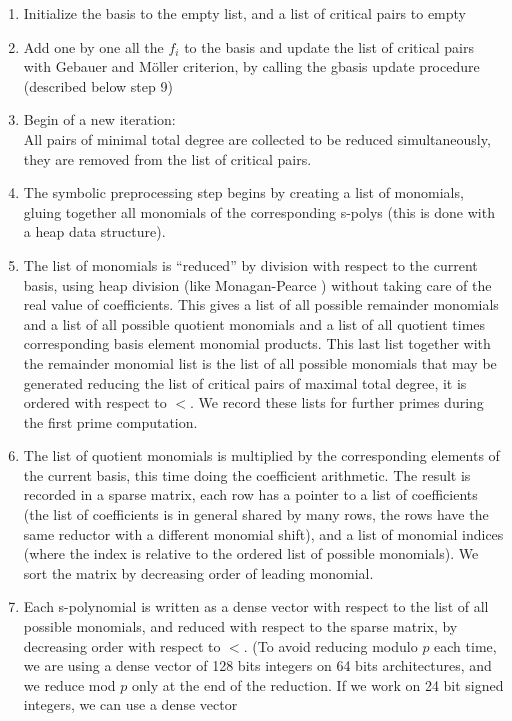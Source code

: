 \documentclass[a4paper,11pt]{article}
\begin{document}
\begin{enumerate}
\item Initialize the basis to the empty list, and a list of critical
  pairs to empty
\item Add one by one all the $f_i$ to the basis and update
the list of critical pairs with Gebauer and M\"oller criterion, 
by calling the gbasis update procedure (described below step 9)
\item Begin of a new iteration:\\
All pairs of minimal total degree are
collected to be reduced simultaneously, they are removed from
the list of critical pairs.
\item The symbolic preprocessing step begins by creating 
a list of monomials, gluing
together all monomials of the corresponding s-polys (this
is done with a heap data structure). 
\item The list of monomials is ``reduced'' by division with respect 
to the current basis,
using heap division (like Monagan-Pearce \cite{monagan2011sparse}) 
without taking care
of the real value of coefficients. This gives a list of all possible remainder
monomials and a list of all possible quotient monomials and a list
of all quotient times corresponding basis element monomial products.
This last list together with the remainder monomial list is the
list of all possible monomials that may be generated reducing
the list of critical pairs of maximal total degree, 
it is ordered with respect to $<$. We
record these lists for further primes during the first prime computation.
\item The list
of quotient monomials is multiplied by the corresponding elements of the current
basis, this time doing the coefficient arithmetic.
The result is recorded in a sparse matrix, each row has a pointer
to a list of coefficients (the list of coefficients 
is in general shared by many rows, the rows have the
same reductor with a different monomial shift), 
and a list of monomial indices (where the index 
is relative to the ordered list of possible monomials). We sort
the matrix by decreasing order of leading monomial.
\item
Each s-polynomial is written as a dense vector with respect to the
list of all possible monomials, and reduced with respect to the
sparse matrix, by decreasing order with respect to $<$.
(To avoid reducing modulo $p$ each time, we are using a dense
vector of 128 bits integers on 64 bits architectures, 
and we reduce mod $p$ only at the end of the reduction. If
we work on 24 bit signed integers, we can use a dense vector 

\end{enumerate}
\end{document}
